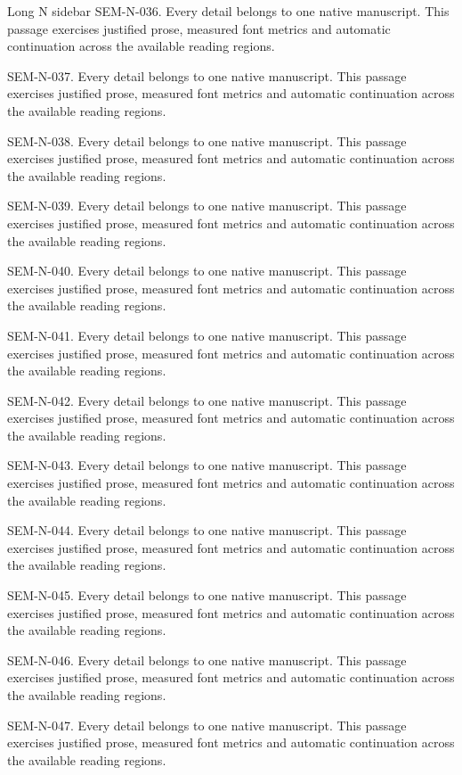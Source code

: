 \begin{m20sidebar}[id=long-narrow]{Long N sidebar}
SEM-N-036. Every detail belongs to one native manuscript. This passage exercises justified prose, measured font metrics and automatic continuation across the available reading regions.\par
SEM-N-037. Every detail belongs to one native manuscript. This passage exercises justified prose, measured font metrics and automatic continuation across the available reading regions.\par
SEM-N-038. Every detail belongs to one native manuscript. This passage exercises justified prose, measured font metrics and automatic continuation across the available reading regions.\par
SEM-N-039. Every detail belongs to one native manuscript. This passage exercises justified prose, measured font metrics and automatic continuation across the available reading regions.\par
SEM-N-040. Every detail belongs to one native manuscript. This passage exercises justified prose, measured font metrics and automatic continuation across the available reading regions.\par
SEM-N-041. Every detail belongs to one native manuscript. This passage exercises justified prose, measured font metrics and automatic continuation across the available reading regions.\par
SEM-N-042. Every detail belongs to one native manuscript. This passage exercises justified prose, measured font metrics and automatic continuation across the available reading regions.\par
SEM-N-043. Every detail belongs to one native manuscript. This passage exercises justified prose, measured font metrics and automatic continuation across the available reading regions.\par
SEM-N-044. Every detail belongs to one native manuscript. This passage exercises justified prose, measured font metrics and automatic continuation across the available reading regions.\par
SEM-N-045. Every detail belongs to one native manuscript. This passage exercises justified prose, measured font metrics and automatic continuation across the available reading regions.\par
SEM-N-046. Every detail belongs to one native manuscript. This passage exercises justified prose, measured font metrics and automatic continuation across the available reading regions.\par
SEM-N-047. Every detail belongs to one native manuscript. This passage exercises justified prose, measured font metrics and automatic continuation across the available reading regions.\par

\end{m20sidebar}
